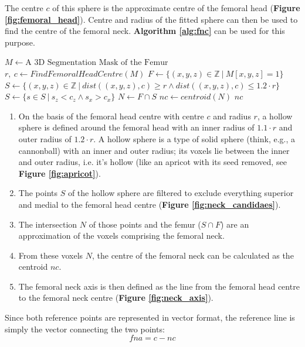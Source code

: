 \documentclass[a4paper,12pt]{article}
\newcommand{\Z}{\mathbb{Z}}
\begin{document}
	The centre $c$ of this sphere is the approximate centre of the femoral head (\textbf{Figure \ref{fig:femoral_head}}).
	Centre and radius of the fitted sphere can then be used to find the centre of the femoral neck.
	\textbf{Algorithm \ref{alg:fnc}} can be used for this purpose.\bigskip

	\begin{algorithm}[H]
		\caption{Femoral Neck Centre Definition}
		\label{alg:fnc}
		\begin{algorithmic}[1]
			\State $M \gets \text{A 3D Segmentation Mask of the Femur}$
			\State $r,\: c \gets FindFemoralHeadCentre(M)$
			\State $F \gets \{(x, y, z) \in \Z \: | \: M[x, y, z] = 1\}$
			\State $S \gets \{(x, y, z) \in \Z \: | \: dist((x, y, z), c) \geq r \land dist((x, y, z), c) \leq 1.2 \cdot r\}$
			\State $S \gets \{s \in S \: | \: s_z < c_z \land s_x > c_x\}$
			\State $N \gets F \cap S$
			\State $nc \gets centroid(N)$
			\State \Return $nc$
			\EndProcedure
		\end{algorithmic}
	\end{algorithm}

	\begin{enumerate}
		\item On the basis of the femoral head centre with centre $c$ and radius $r$, a hollow sphere is defined around the femoral head with an inner radius of $1.1 \cdot r$ and outer radius of $1.2 \cdot r$.
		A hollow sphere is a type of solid sphere (think, e.g., a cannonball) with an inner and outer radius; its voxels lie between the inner and outer radius, i.e. it's hollow (like an apricot with its seed removed, see \textbf{Figure \ref{fig:apricot}}).
		\item The points $S$ of the hollow sphere are filtered to exclude everything superior and medial to the femoral head centre (\textbf{Figure \ref{fig:neck_candidaes}}).
		\item The intersection $N$ of those points and the femur ($S \cap F$) are an approximation of the voxels comprising the femoral neck.
		\item From these voxels $N$, the centre of the femoral neck can be calculated as the centroid $nc$.
		\item The femoral neck axis is then defined as the line from the femoral head centre to the femoral neck centre (\textbf{Figure \ref{fig:neck_axis}}).
	\end{enumerate}

	\noindent Since both reference points are represented in vector format, the reference line is simply the vector connecting the two points: \[fna = c - nc\]
	
\end{document}
